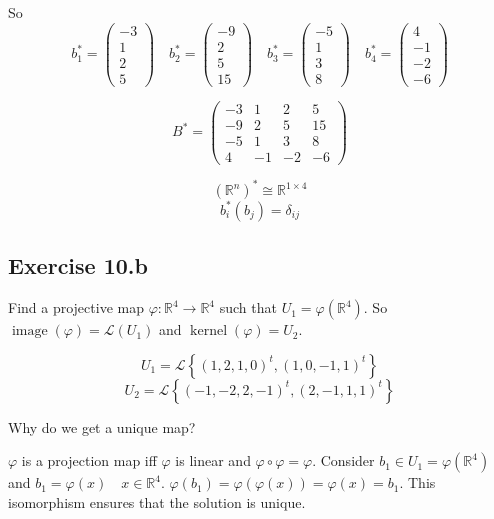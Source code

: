 \documentclass[a4paper]{article}
\theoremstyle{definition}
\DeclareMathOperator\kernel{kernel}
\DeclareMathOperator\image{image}
\newcommand\set[1]{\left\{#1\right\}}
\begin{document}
So
\[
  b_1^* = \begin{pmatrix} -3 \\ 1 \\ 2 \\ 5 \end{pmatrix} \quad
  b_2^* = \begin{pmatrix} -9 \\ 2 \\ 5 \\ 15 \end{pmatrix} \quad
  b_3^* = \begin{pmatrix} -5 \\ 1 \\ 3 \\ 8 \end{pmatrix} \quad
  b_4^* = \begin{pmatrix} 4 \\ -1 \\ -2 \\ -6 \end{pmatrix}
\]

\[
  B^* = \begin{pmatrix}
    -3 & 1 & 2 & 5 \\
    -9 & 2 & 5 & 15 \\
    -5 & 1 & 3 & 8 \\
    4 & -1 & -2 & -6
  \end{pmatrix}
\]

\[ (\mathbb R^n)^* \cong \mathbb R^{1 \times 4} \]
\[ b_i^*(b_j) = \delta_{ij} \]

\subsection{Exercise 10.b}

Find a projective map $\varphi: \mathbb R^4 \to \mathbb R^4$ such that $U_1 = \varphi(\mathbb R^4)$.
So $\image(\varphi) = \mathcal L(U_1)$ and $\kernel(\varphi) = U_2$.

\[ U_1 = \mathcal L\set{(1, 2, 1, 0)^t, (1, 0, -1, 1)^t} \]
\[ U_2 = \mathcal L\set{(-1, -2, 2, -1)^t, (2, -1, 1, 1)^t} \]

Why do we get a unique map?

$\varphi$ is a projection map iff $\varphi$ is linear and $\varphi \circ \varphi = \varphi$.
Consider $b_1 \in U_1 = \varphi(\mathbb R^4)$ and $b_1 = \varphi(x) \quad x \in \mathbb R^4$.
$\varphi(b_1) = \varphi(\varphi(x)) = \varphi(x) = b_1$. This isomorphism ensures that
the solution is unique.
\end{document}
